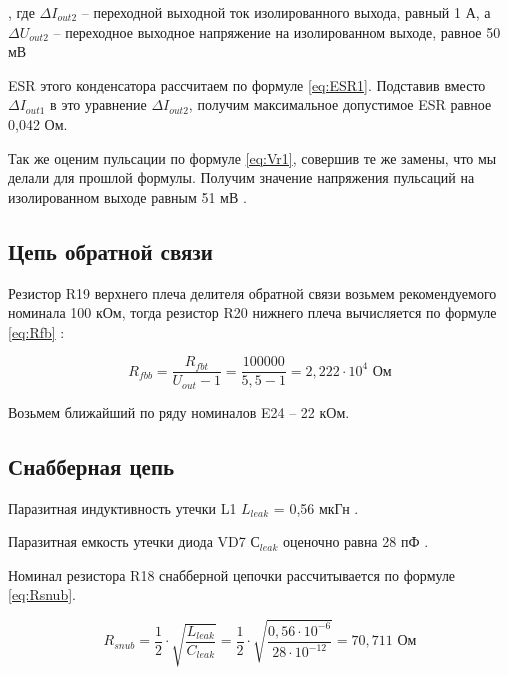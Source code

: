 , где $\Delta I_{out2}$ -- переходной выходной ток изолированного выхода, равный 1 А, а $\Delta U_{out2}$ --
переходное выходное напряжение на изолированном выходе, равное 50 мВ

ESR этого конденсатора рассчитаем по формуле \ref{eq:ESR1}.  Подставив вместо $\Delta I_{out1}$ 
в это уравнение $\Delta I_{out2}$, получим максимальное допустимое ESR равное 0,042 Ом.

Так же оценим пульсации по формуле \ref{eq:Vr1}, совершив те же замены, что мы делали для прошлой формулы. 
Получим значение напряжения пульсаций на изолированном выходе равным 51 мВ \cite{LMR36520:Aplication Note}. 


\subsection{Цепь обратной связи}
\hspace{1cm}

Резистор R19 верхнего плеча делителя обратной связи возьмем рекомендуемого номинала 100 кОм, тогда резистор
R20 нижнего плеча вычисляется по формуле \ref{eq:Rfb} \cite{LMR36520:datasheet}:

\begin{equation}
   R_{fbb} = \frac{R_{fbt}}{U_{out} - 1} =
   \frac{100000}{5,5 - 1} = 2,222 \cdot 10^{4} \text{ Ом}
    \label{eq:Rfb}
\end{equation}

Возьмем ближайший по ряду номиналов E24 -- 22 кОм. 


\subsection{Снабберная цепь}
\hspace{1cm}

Паразитная индуктивность утечки L1 $L_{leak}$ = 0,56 мкГн \cite{MSD1278:datasheet}. 

Паразитная емкость утечки диода VD7 $С_{leak}$ оценочно равна 28 пФ \cite{MBRS260T3G:datasheet}. 

Номинал резистора R18 снабберной цепочки рассчитывается по формуле \ref{eq:Rsnub}.

\begin{equation}
    R_{snub} = \frac{1}{2} \cdot \sqrt{\frac{L_{leak}}{C_{leak}}} = 
    \frac{1}{2} \cdot \sqrt{\frac{0,56 \cdot 10^{-6}}{28 \cdot 10^{-12}}} =
    70,711 \text{ Ом}
    \label{eq:Rsnub}
 \end{equation}

